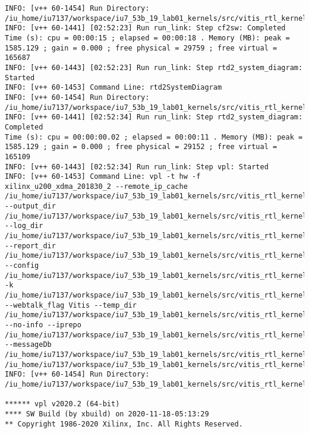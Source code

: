 \begin{center}
\begin{lstlisting}[label=lst:vlog,caption=Файл v++\_vinc.log]
INFO: [v++ 60-1454] Run Directory: /iu_home/iu7137/workspace/iu7_53b_19_lab01_kernels/src/vitis_rtl_kernel/rtl_kernel_wizard_1/_x/link/run_link
INFO: [v++ 60-1441] [02:52:23] Run run_link: Step cf2sw: Completed
Time (s): cpu = 00:00:15 ; elapsed = 00:00:18 . Memory (MB): peak = 1585.129 ; gain = 0.000 ; free physical = 29759 ; free virtual = 165687
INFO: [v++ 60-1443] [02:52:23] Run run_link: Step rtd2_system_diagram: Started
INFO: [v++ 60-1453] Command Line: rtd2SystemDiagram
INFO: [v++ 60-1454] Run Directory: /iu_home/iu7137/workspace/iu7_53b_19_lab01_kernels/src/vitis_rtl_kernel/rtl_kernel_wizard_1/_x/link/run_link
INFO: [v++ 60-1441] [02:52:34] Run run_link: Step rtd2_system_diagram: Completed
Time (s): cpu = 00:00:00.02 ; elapsed = 00:00:11 . Memory (MB): peak = 1585.129 ; gain = 0.000 ; free physical = 29152 ; free virtual = 165109
INFO: [v++ 60-1443] [02:52:34] Run run_link: Step vpl: Started
INFO: [v++ 60-1453] Command Line: vpl -t hw -f xilinx_u200_xdma_201830_2 --remote_ip_cache /iu_home/iu7137/workspace/iu7_53b_19_lab01_kernels/src/vitis_rtl_kernel/rtl_kernel_wizard_1/.ipcache --output_dir /iu_home/iu7137/workspace/iu7_53b_19_lab01_kernels/src/vitis_rtl_kernel/rtl_kernel_wizard_1/_x/link/int --log_dir /iu_home/iu7137/workspace/iu7_53b_19_lab01_kernels/src/vitis_rtl_kernel/rtl_kernel_wizard_1/_x/logs/link --report_dir /iu_home/iu7137/workspace/iu7_53b_19_lab01_kernels/src/vitis_rtl_kernel/rtl_kernel_wizard_1/_x/reports/link --config /iu_home/iu7137/workspace/iu7_53b_19_lab01_kernels/src/vitis_rtl_kernel/rtl_kernel_wizard_1/_x/link/int/vplConfig.ini -k /iu_home/iu7137/workspace/iu7_53b_19_lab01_kernels/src/vitis_rtl_kernel/rtl_kernel_wizard_1/_x/link/int/kernel_info.dat --webtalk_flag Vitis --temp_dir /iu_home/iu7137/workspace/iu7_53b_19_lab01_kernels/src/vitis_rtl_kernel/rtl_kernel_wizard_1/_x/link --no-info --iprepo /iu_home/iu7137/workspace/iu7_53b_19_lab01_kernels/src/vitis_rtl_kernel/rtl_kernel_wizard_1/_x/link/int/xo/ip_repo/mycompany_com_kernel_rtl_kernel_wizard_1_1_0 --messageDb /iu_home/iu7137/workspace/iu7_53b_19_lab01_kernels/src/vitis_rtl_kernel/rtl_kernel_wizard_1/_x/link/run_link/vpl.pb /iu_home/iu7137/workspace/iu7_53b_19_lab01_kernels/src/vitis_rtl_kernel/rtl_kernel_wizard_1/_x/link/int/dr.bd.tcl
INFO: [v++ 60-1454] Run Directory: /iu_home/iu7137/workspace/iu7_53b_19_lab01_kernels/src/vitis_rtl_kernel/rtl_kernel_wizard_1/_x/link/run_link

****** vpl v2020.2 (64-bit)
**** SW Build (by xbuild) on 2020-11-18-05:13:29
** Copyright 1986-2020 Xilinx, Inc. All Rights Reserved.


\end{lstlisting}
\end{center}
